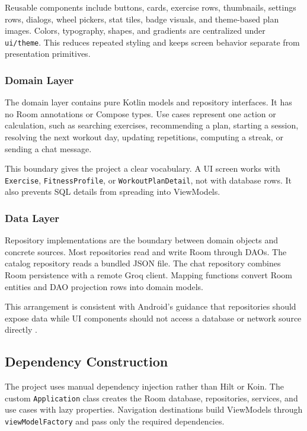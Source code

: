 Reusable components include buttons, cards, exercise rows, thumbnails, settings rows, dialogs, wheel pickers, stat tiles, badge visuals, and theme-based plan images. Colors, typography, shapes, and gradients are centralized under \texttt{ui/theme}. This reduces repeated styling and keeps screen behavior separate from presentation primitives.

\subsubsection{Domain Layer}

The domain layer contains pure Kotlin models and repository interfaces. It has no Room annotations or Compose types. Use cases represent one action or calculation, such as searching exercises, recommending a plan, starting a session, resolving the next workout day, updating repetitions, computing a streak, or sending a chat message.

This boundary gives the project a clear vocabulary. A UI screen works with \texttt{Exercise}, \texttt{FitnessProfile}, or \texttt{WorkoutPlanDetail}, not with database rows. It also prevents SQL details from spreading into ViewModels.

\subsubsection{Data Layer}

Repository implementations are the boundary between domain objects and concrete sources. Most repositories read and write Room through DAOs. The catalog repository reads a bundled JSON file. The chat repository combines Room persistence with a remote Groq client. Mapping functions convert Room entities and DAO projection rows into domain models.

This arrangement is consistent with Android's guidance that repositories should expose data while UI components should not access a database or network source directly \cite{androidrecommendations}.

\subsection{Dependency Construction}

The project uses manual dependency injection rather than Hilt or Koin. The custom \texttt{Application} class creates the Room database, repositories, services, and use cases with lazy properties. Navigation destinations build ViewModels through \texttt{viewModelFactory} and pass only the required dependencies.

